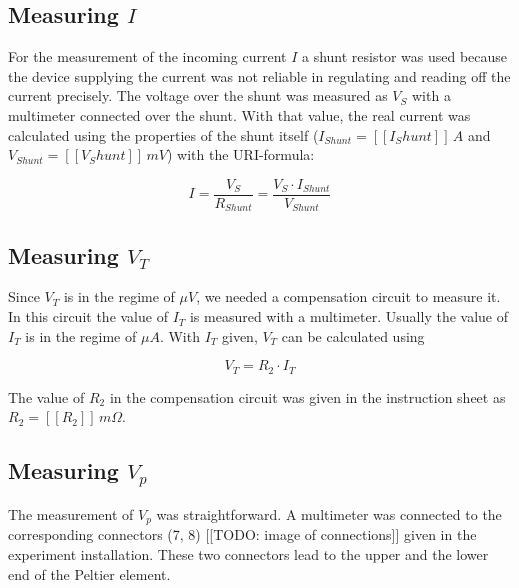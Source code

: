 \documentclass[a4paper]{article}
\begin{document}
\subsection{Measuring $I$}

For the measurement of the incoming current $I$ a shunt resistor was used because the device supplying the current was not reliable in regulating and reading off the current precisely. The voltage over the shunt was measured as $V_S$ with a multimeter connected over the shunt. With that value, the real current was calculated using the properties of the shunt itself ($I_{Shunt} = [[I_Shunt]]\, A$ and $V_{Shunt} = [[V_Shunt]]\, mV$) with the URI-formula:

\begin{equation}
I = \frac{V_S}{R_{Shunt}} = \frac{V_S \cdot I_{Shunt}}{V_{Shunt}}
\label{eq:current}
\end{equation}

\subsection{Measuring $V_T$}

Since $V_T$ is in the regime of $\mu V$, we needed a compensation circuit to measure it. In this circuit the value of $I_T$ is measured with a multimeter. Usually the value of $I_T$ is in the regime of $\mu A$. With $I_T$ given, $V_T$ can be calculated using

\begin{equation}
V_T = R_2 \cdot I_T
\label{eq:V_T}
\end{equation}

The value of $R_2$ in the compensation circuit was given in the instruction sheet as $R_2 = [[R_2]]\, m\Omega$.

\subsection{Measuring $V_p$}

The measurement of $V_p$ was straightforward. A multimeter was connected to the corresponding connectors (7, 8) [[TODO: image of connections]] given in the experiment installation. These two connectors lead to the upper and the lower end of the Peltier element.
\end{document}
